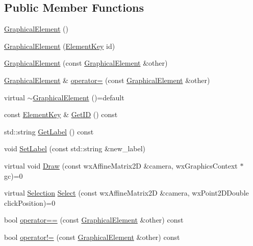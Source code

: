 \subsection*{Public Member Functions}
\begin{DoxyCompactItemize}
\item 
\hyperlink{class_graphical_element_a9f116ee2cd16dd099c2579864415d7b8}{Graphical\+Element} ()
\item 
\hyperlink{class_graphical_element_a1ff046ba61906c1c7caa49c09de58c9c}{Graphical\+Element} (\hyperlink{_graphical_element_8h_ade5fd6c85839a416577ff9de1605141e}{Element\+Key} id)
\item 
\hyperlink{class_graphical_element_a04282c63cee46ebc0f3f7c46fc871a40}{Graphical\+Element} (const \hyperlink{class_graphical_element}{Graphical\+Element} \&other)
\item 
\hyperlink{class_graphical_element}{Graphical\+Element} \& \hyperlink{class_graphical_element_add7f7f8fe319b3d966ffe3e756ef7b2e}{operator=} (const \hyperlink{class_graphical_element}{Graphical\+Element} \&other)
\item 
virtual \hyperlink{class_graphical_element_ad96eef4506d4680b10507ab563552b48}{$\sim$\+Graphical\+Element} ()=default
\item 
const \hyperlink{_graphical_element_8h_ade5fd6c85839a416577ff9de1605141e}{Element\+Key} \& \hyperlink{class_graphical_element_a09ed630bc819c852f96ed20dda8d84e8}{Get\+ID} () const
\item 
std\+::string \hyperlink{class_graphical_element_a82ab7426dc354b2a91bf0ccc0a34b0b3}{Get\+Label} () const
\item 
void \hyperlink{class_graphical_element_a43627056bafcd65a43eb424dff889e99}{Set\+Label} (const std\+::string \&new\+\_\+label)
\item 
virtual void \hyperlink{class_graphical_element_ab137d6d3ad82fd08b5610519dda0c600}{Draw} (const wx\+Affine\+Matrix2D \&camera, wx\+Graphics\+Context $\ast$gc)=0
\item 
virtual \hyperlink{struct_selection}{Selection} \hyperlink{class_graphical_element_a2627b34e57829f942aa00720d9cc8b46}{Select} (const wx\+Affine\+Matrix2D \&camera, wx\+Point2\+D\+Double click\+Position)=0
\item 
bool \hyperlink{class_graphical_element_a4bbe253b3e4455a4084de813cf2235a8}{operator==} (const \hyperlink{class_graphical_element}{Graphical\+Element} \&other) const
\item 
bool \hyperlink{class_graphical_element_a23d2d7494818f017ca0f0ea4f36f54b5}{operator!=} (const \hyperlink{class_graphical_element}{Graphical\+Element} \&other) const
\end{DoxyCompactItemize}
